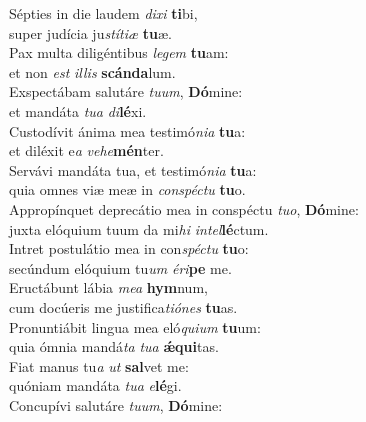 \evenverse Sépties in die laudem \textit{di}\textit{xi} \textbf{ti}bi,~\*\\
\evenverse super judícia ju\textit{stí}\textit{ti}\textit{æ} \textbf{tu}æ.\\
\oddverse Pax multa diligéntibus \textit{le}\textit{gem} \textbf{tu}am:~\*\\
\oddverse et non \textit{est} \textit{il}\textit{lis} \textbf{scán}\textbf{da}lum.\\
\evenverse Exspectábam salutáre \textit{tu}\textit{um}, \textbf{Dó}mine:~\*\\
\evenverse et mandáta \textit{tu}\textit{a} \textit{di}\textbf{lé}xi.\\
\oddverse Custodívit ánima mea testimó\textit{ni}\textit{a} \textbf{tu}a:~\*\\
\oddverse et diléxit e\textit{a} \textit{ve}\textit{he}\textbf{mén}ter.\\
\evenverse Servávi mandáta tua, et testimó\textit{ni}\textit{a} \textbf{tu}a:~\*\\
\evenverse quia omnes viæ meæ in \textit{con}\textit{spé}\textit{ctu} \textbf{tu}o.\\
\oddverse Appropínquet deprecátio mea in conspéctu \textit{tu}\textit{o}, \textbf{Dó}mine:~\*\\
\oddverse juxta elóquium tuum da mi\textit{hi} \textit{in}\textit{tel}\textbf{lé}ctum.\\
\evenverse Intret postulátio mea in con\textit{spé}\textit{ctu} \textbf{tu}o:~\*\\
\evenverse secúndum elóquium tu\textit{um} \textit{é}\textit{ri}\textbf{pe} me.\\
\oddverse Eructábunt lábia \textit{me}\textit{a} \textbf{hym}num,~\*\\
\oddverse cum docúeris me justifica\textit{ti}\textit{ó}\textit{nes} \textbf{tu}as.\\
\evenverse Pronuntiábit lingua mea eló\textit{qui}\textit{um} \textbf{tu}um:~\*\\
\evenverse quia ómnia mandá\textit{ta} \textit{tu}\textit{a} \textbf{ǽ}\textbf{qui}tas.\\
\oddverse Fiat manus tu\textit{a} \textit{ut} \textbf{sal}vet me:~\*\\
\oddverse quóniam mandáta \textit{tu}\textit{a} \textit{e}\textbf{lé}gi.\\
\evenverse Concupívi salutáre \textit{tu}\textit{um}, \textbf{Dó}mine:~\*\\
